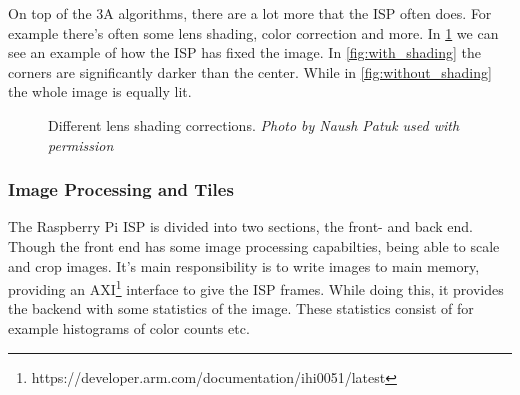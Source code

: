 On top of the 3A algorithms, there are a lot more that the ISP often does. For
example there's often some lens shading, color correction and more. In
\cref{fig:lens_shading} we can see an example of how the ISP has fixed the image.
In \cref{fig:with_shading} the corners are significantly darker than the center.
While in \cref{fig:without_shading} the whole image is equally lit.

\begin{figure}[htpb]
    \centering
    \qquad

    \caption{Different lens shading corrections. \textit{Photo by Naush Patuk used with permission}}\label{fig:lens_shading}
\end{figure}

\subsubsection{Image Processing and Tiles}
The Raspberry Pi ISP is divided into two sections, the front- and back end.
Though the front end has some image processing capabilties, being able to scale
and crop images. It's main responsibility is to write images to main memory,
providing an
AXI\footnote{https://developer.arm.com/documentation/ihi0051/latest} interface
to give the ISP frames. While doing this, it provides the backend with some
statistics of the image. These statistics consist of for example histograms
of color counts etc.

